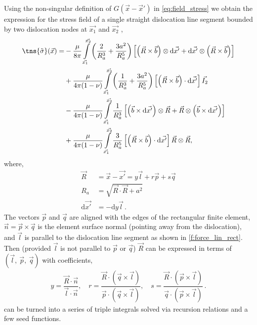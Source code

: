 Using the non-singular definition of $ G(\vec{x}-\vec{x}') $ in \cref{eq:field_stress} we obtain the expression for the stress field of a single straight dislocation line segment bounded by two dislocation nodes at $\vec{x_1}$ and $\vec{x_2}$ \cite{a_non-singular_continuum_theory_of_dislocations},
\begin{align}
  \label{eq:stressIntro}
  \tns{\tilde{\sigma}}(\vec{x}) = &
  - \dfrac{\mu}{8\pi} \int\limits_{\vec{x_1}}^{\vec{x_2}} \left( \dfrac{2}{R_{a}^{3}} + \dfrac{3a^2}{R_{a}^{5}} \right) \left[ \left(\vec{R} \times \vec{b}\right) \otimes \mathrm{d}\vec{x'} + \mathrm{d}\vec{x'} \otimes \left(\vec{R} \times \vec{b}\right) \right]          \\
                                  & + \dfrac{\mu}{4\pi(1-\nu)} \int\limits_{\vec{x_1}}^{\vec{x_2}} \left( \dfrac{1}{R_{a}^{3}} + \dfrac{3a^2}{R_{a}^{5}} \right) \left[ \left(\vec{R} \times \vec{b}\right) \cdot \mathrm{d}\vec{x'} \right]\vec{I_2}\nonumber                  \\
                                  & -\dfrac{\mu}{4\pi(1-\nu)} \int\limits_{\vec{x_1}}^{\vec{x_2}}  \dfrac{1}{R_{a}^{3}} \left[ \left(\vec{b} \times \mathrm{d}\vec{x'}\right) \otimes \vec{R} + \vec{R} \otimes \left(\vec{b} \times \mathrm{d}\vec{x'}\right) \right]\nonumber \\
                                  & + \dfrac{\mu}{4\pi(1-\nu)} \int\limits_{\vec{x_1}}^{\vec{x_2}} \dfrac{3}{R_{a}^{5}} \left[ \left(\vec{R} \times \vec{b}\right) \cdot \mathrm{d}\vec{x'} \right]\vec{R}\otimes\vec{R}\nonumber,
\end{align}
where,
\begin{align}
  \vec{R}            & = \vec{x} - \vec{x'} = y \vec{l} + r \vec{p} + s \vec{q} \\
  R_a                & = \sqrt{\vec{R} \cdot \vec{R} + a^2}                     \\
  \mathrm{d}\vec{x'} & = -\mathrm{d} y \vec{l}\,.
\end{align}
The vectors $\vec{p}$ and $\vec{q}$ are aligned with the edges of the rectangular finite element, $\vec{n} = \vec{p} \times \vec{q}$ is the element surface normal (pointing away from the dislocation), and $\vec{l}$ is parallel to the dislocation line segment as shown in \cref{f:force_lin_rect}. Then (provided $\vec{l}$ is not parallel to $\vec{p}$ or $\vec{q}$) $\vec{R}$ can be expressed in terms of $(\vec{l},~\vec{p},~\vec{q})$ with coefficients,
\begin{align}
  y = \dfrac{\vec{R}\cdot \vec{n}}{\vec{l}\cdot \vec{n}} \label{eq:problemIntro},\quad
  r = \dfrac{\vec{R}\cdot (\vec{q} \times \vec{l})}{\vec{p}\cdot (\vec{q} \times \vec{l})}, \quad
  s = \dfrac{\vec{R}\cdot (\vec{p} \times \vec{l})}{\vec{q}\cdot (\vec{p} \times \vec{l})}\,.
\end{align}
 can be turned into a series of triple integrals solved via recursion relations and a few seed functions.

